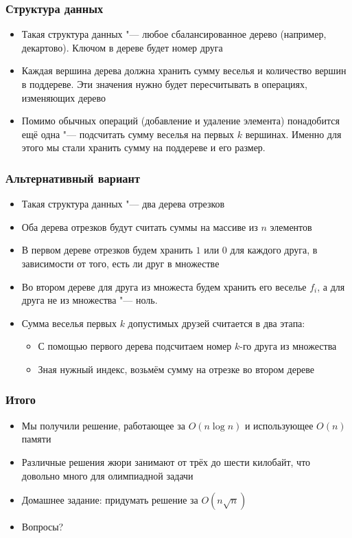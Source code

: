 \begin{frame}
  \frametitle{Структура данных}
  \begin{itemize}
    \item Такая структура данных "--- любое сбалансированное дерево 
    (например, декартово). Ключом в дереве будет номер друга
    \item Каждая вершина дерева должна хранить сумму веселья и количество 
    вершин в поддереве. Эти значения нужно будет
          пересчитывать в операциях, изменяющих дерево
    \item Помимо обычных операций (добавление и удаление элемента) понадобится 
    ещё одна "--- подсчитать сумму веселья на первых $k$ вершинах.
          Именно для этого мы стали хранить сумму на поддереве и его размер.
  \end{itemize}
\end{frame}

\begin{frame}
  \frametitle{Альтернативный вариант}
  \begin{itemize}
    \item Такая структура данных "--- два дерева отрезков
    \item Оба дерева отрезков будут считать суммы на массиве из $n$ элементов
    \item В первом дереве отрезков будем хранить $1$ или $0$ для каждого друга, 
    в зависимости от того, есть ли друг в множестве
    \item Во втором дереве для друга из множеста будем хранить его веселье $f_i$, 
    а для друга не из множества "--- ноль.
    \item Сумма веселья первых $k$ допустимых друзей считается в два этапа:
      \begin{itemize}
        \item С помощью первого дерева подсчитаем номер $k$-го друга из множества
        \item Зная нужный индекс, возьмём сумму на отрезке во втором дереве
      \end{itemize}
  \end{itemize}
\end{frame}

\begin{frame}
  \frametitle{Итого}
  \begin{itemize}
    \item Мы получили решение, работающее за $O(n\log{n})$ и использующее $O(n)$ памяти
    \item Различные решения жюри занимают от трёх до шести килобайт, 
    что довольно много для олимпиадной задачи
    \item Домашнее задание: придумать решение за $O(n\sqrt{n})$
    \item Вопросы?
  \end{itemize}
\end{frame}

